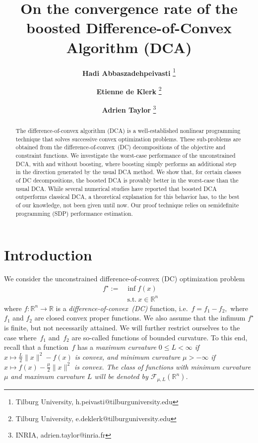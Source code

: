 \documentclass{article} %
\title{On the convergence rate of  the boosted Difference-of-Convex Algorithm (DCA)}
\author{
\textbf{Hadi Abbaszadehpeivasti}
	\thanks{Tilburg University,	 h.peivasti@tilburguniversity.edu   }
	\and
	\textbf{Etienne de Klerk}
	\thanks{Tilburg University,	e.deklerk@tilburguniversity.edu
	}	
	\and
\textbf{Adrien Taylor}
	\thanks{INRIA,	adrien.taylor@inria.fr }
}
\begin{document}
	\maketitle
	
	\begin{abstract}
	The difference-of-convex algorithm (DCA) is a well-established nonlinear programming technique
that solves successive convex optimization problems. These sub-problems are obtained from the difference-of-convex~(DC)
decompositions of the objective and constraint functions. We investigate the worst-case performance of the unconstrained DCA,
with and without boosting, where boosting simply performs an additional step in the direction generated by the usual DCA method.
 We show that, for certain classes of DC decompositions, the boosted DCA is provably better in the worst-case than the usual DCA.
 While several numerical studies have reported that boosted DCA outperforms classical DCA, a theoretical explanation
 for this behavior has, to the best of our knowledge, not been given until now.
 Our proof technique relies on semidefinite programming (SDP) performance estimation.


	\end{abstract}
	\section{Introduction}
We consider the unconstrained difference-of-convex (DC) optimization problem
	\begin{align}\label{P}
\  \ f^\star := &\inf f(x)\\
\nonumber & \ \text{s.t.} \ x\in \mathbb{R}^n
\end{align}
where $f: \mathbb{R}^n\to \mathbb{R}$ is a \emph{difference-of-convex~(DC)} function, i.e.\
$
f=f_1-f_2,
$
where
 $f_1$ and $f_2$ are closed convex proper functions. We also assume that the infimum $f^\star$ is finite, but not necessarily attained.
We will further restrict ourselves to the case where~$f_1$ and~$f_2$ are so-called functions of bounded curvature. To this end, recall that
a  function~$f$ has a \em{maximum curvature} $0 \le L < \infty$ if
 $
 x \mapsto \tfrac{L}{2}\| x\|^2-f(x)$  is convex,
and   \em{minimum curvature}
 $\mu > -\infty$ if
 $
 x \mapsto f(x)-\tfrac{\mu}{2}\| x\|^2$ { is convex.}
 The class of functions with minimum curvature $\mu$ and maximum curvature $L$ will be denoted by $\mathcal{F}_{\mu,L}(\mathbb{R}^n)$.
\end{document}
